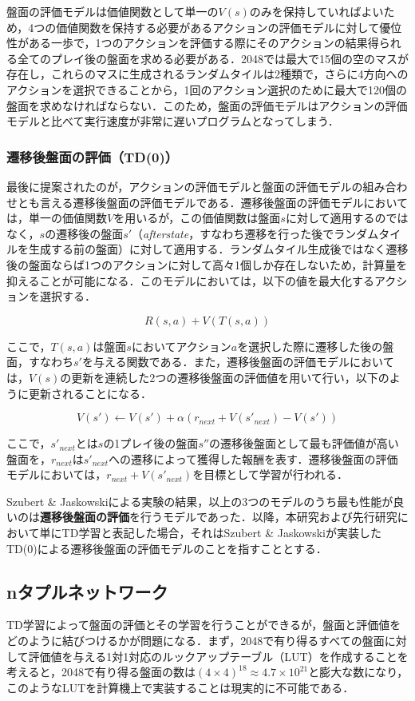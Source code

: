 \documentclass{suribt}
\begin{document}
盤面の評価モデルは価値関数として単一の$V(s)$のみを保持していればよいため，4つの価値関数を保持する必要があるアクションの評価モデルに対して優位性がある一歩で，1つのアクションを評価する際にそのアクションの結果得られる全てのプレイ後の盤面を求める必要がある．2048では最大で15個の空のマスが存在し，これらのマスに生成されるランダムタイルは2種類で，さらに4方向へのアクションを選択できることから，1回のアクション選択のために最大で120個の盤面を求めなければならない．このため，盤面の評価モデルはアクションの評価モデルと比べて実行速度が非常に遅いプログラムとなってしまう．

\subsubsection{遷移後盤面の評価（TD(0)）}
最後に提案されたのが，アクションの評価モデルと盤面の評価モデルの組み合わせとも言える遷移後盤面の評価モデルである．遷移後盤面の評価モデルにおいては，単一の価値関数$V$を用いるが，この価値関数は盤面$s$に対して適用するのではなく，$s$の遷移後の盤面$s'$（\textit{afterstate}，すなわち遷移を行った後でランダムタイルを生成する前の盤面）に対して適用する．ランダムタイル生成後ではなく遷移後の盤面ならば1つのアクションに対して高々1個しか存在しないため，計算量を抑えることが可能になる．このモデルにおいては，以下の値を最大化するアクションを選択する．

\[
	R(s,a) + V(T(s,a))
\]

ここで，$T(s,a)$は盤面$s$においてアクション$a$を選択した際に遷移した後の盤面，すなわち$s'$を与える関数である．また，遷移後盤面の評価モデルにおいては，$V(s)$の更新を連続した2つの遷移後盤面の評価値を用いて行い，以下のように更新されることになる．

\[
	V(s') \leftarrow V(s') + \alpha (r_{next} + V(s'_{next}) - V(s') )
\]

ここで，$s'_{next}$とは$s$の1プレイ後の盤面$s''$の遷移後盤面として最も評価値が高い盤面を，$r_{next}$は$s'_{next}$への遷移によって獲得した報酬を表す．遷移後盤面の評価モデルにおいては，$r_{next}+V(s'_{next})$を目標として学習が行われる．

Szubert \& Jaskowskiによる実験の結果，以上の3つのモデルのうち最も性能が良いのは\textbf{遷移後盤面の評価}を行うモデルであった．以降，本研究および先行研究において単にTD学習と表記した場合，それはSzubert \& Jaskowskiが実装したTD(0)による遷移後盤面の評価モデルのことを指すこととする．

\subsection{nタプルネットワーク}
TD学習によって盤面の評価とその学習を行うことができるが，盤面と評価値をどのように結びつけるかが問題になる．まず，2048で有り得るすべての盤面に対して評価値を与える1対1対応のルックアップテーブル（LUT）を作成することを考えると，2048で有り得る盤面の数は$(4 \times 4)^{18} \approx 4.7 \times 10^{21}$と膨大な数になり，このようなLUTを計算機上で実装することは現実的に不可能である．
\end{document}
